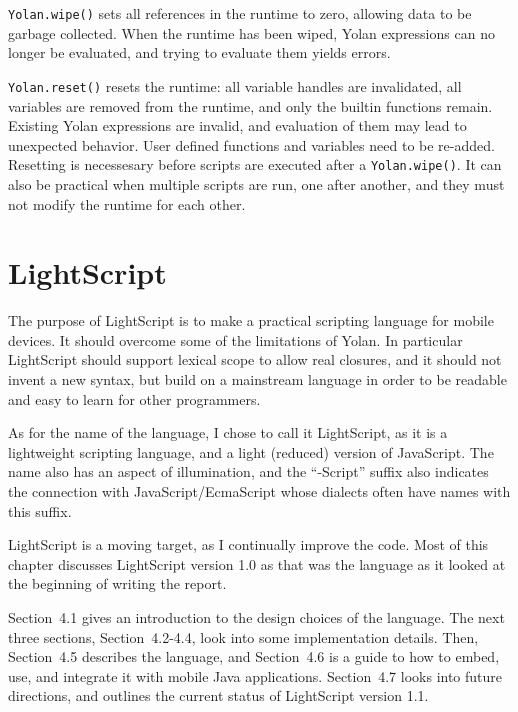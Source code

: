 \documentclass[11pt]{report}
\begin{document}
\verb|Yolan.wipe()| sets all references in the runtime to zero, allowing data to be garbage collected.
When the runtime has been wiped, Yolan expressions can no longer be evaluated, and trying to evaluate them yields errors. 

\verb|Yolan.reset()| resets the runtime: all variable handles are invalidated, all variables are removed from the runtime, and only the builtin functions remain. Existing Yolan expressions are invalid, and evaluation of them may lead to unexpected behavior. User defined functions and variables need to be re-added.
Resetting is necessesary before scripts are executed after a \verb|Yolan.wipe()|.
It can also be practical when multiple scripts are run, one after another, and they must not modify the runtime for each other.

\chapter{LightScript}
\label{lightscript}

The purpose of LightScript is to make a practical scripting language for mobile devices. 
It should overcome some of the limitations of Yolan. In particular LightScript should support lexical scope to allow real closures, and it should not invent a new syntax, but build on a mainstream language in order to be readable and easy to learn for other programmers.

As for the name of the language, I chose to call it LightScript, as it is a lightweight scripting language, and a light (reduced) version of JavaScript. The name also has an aspect of illumination, and the ``-Script'' suffix also indicates the connection with JavaScript/EcmaScript whose dialects often have names with this suffix.

LightScript is a moving target, as I continually improve the code. Most of this chapter discusses LightScript version 1.0 as that was the language as it looked at the beginning of writing the report.

Section~4.1 gives an introduction to the design choices of the language. The next three sections, Section~4.2-4.4, look into some implementation details. Then, Section~4.5 describes the language, and Section~4.6 is a guide to how to embed, use, and integrate it with mobile Java applications.
Section~4.7 looks into future directions, and outlines the current status of LightScript version 1.1. 

\end{document}
